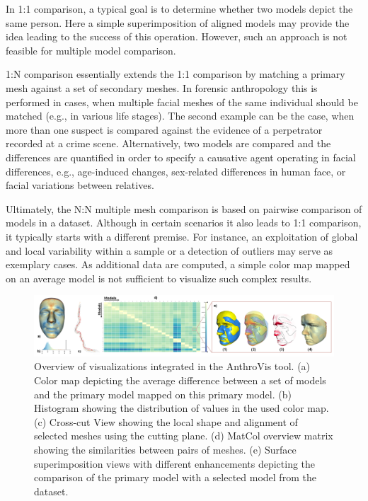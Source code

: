 \documentclass[final,5p,times]{elsarticle}
\begin{document}
In 1:1 comparison, a typical goal is to determine whether two models depict the same person. 
Here a simple superimposition of aligned models may provide the idea leading to the success of this operation.
However, such an approach is not feasible for multiple model comparison.

1:N comparison essentially extends the 1:1 comparison by matching a primary mesh against a set of secondary meshes. 
In forensic anthropology this is performed in cases, when multiple facial meshes of the same individual should be matched (e.g., in various life stages).
The second example can be the case, when more than one suspect is compared against the evidence of a perpetrator recorded at a crime scene. 
Alternatively, two models are compared and the differences are quantified in order to specify a causative agent operating in facial differences, e.g., age-induced changes, sex-related differences in human face, or facial variations between relatives.

Ultimately, the N:N multiple mesh comparison is based on pairwise comparison of models in a dataset. 
Although in certain scenarios it also leads to 1:1 comparison, it typically starts with a different premise.
For instance, an exploitation of global and local variability within a sample or a detection of outliers may serve as exemplary cases.
As additional data are computed, a simple color map mapped on an average model is not sufficient to visualize such complex results.

\begin{figure}[htb]
	\centering
  \includegraphics[width=1.0\linewidth]{pictures/overview3.png}
  \caption{\label{fig:overview}Overview of visualizations integrated in the AnthroVis tool. (a) Color map depicting the average difference between a set of models and the primary model mapped on this primary model. (b) Histogram showing the distribution of values in the used color map. (c) Cross-cut View showing the local shape and alignment of selected meshes using the cutting plane. (d) MatCol overview matrix showing the similarities between pairs of meshes. (e) Surface superimposition views with different enhancements depicting the comparison of the primary model with a selected model from the dataset.}
\vspace{-2mm}
\end{figure}
\end{document}
